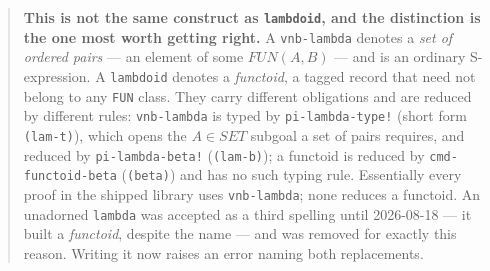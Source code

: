 \begin{itemize}
  \begin{quote}
  \textbf{This is not the same construct as \texttt{lambdoid}, and the
  distinction is the one most worth getting right.}  A \texttt{vnb-lambda}
  denotes a \emph{set of ordered pairs} --- an element of some
  $\mathit{FUN}(A,B)$ --- and is an ordinary S-expression.  A
  \texttt{lambdoid} denotes a \emph{functoid}, a tagged record that need not
  belong to any \texttt{FUN} class.  They carry different obligations and are
  reduced by different rules: \texttt{vnb-lambda} is typed by
  \texttt{pi-lambda-type!} (short form \texttt{(lam-t)}), which opens the
  $A \in \mathit{SET}$ subgoal a set of pairs requires, and reduced by
  \texttt{pi-lambda-beta!} (\texttt{(lam-b)}); a functoid is reduced by
  \texttt{cmd-functoid-beta} (\texttt{(beta)}) and has no such typing rule.
  Essentially every proof in the shipped library uses \texttt{vnb-lambda};
  none reduces a functoid.  An unadorned \texttt{lambda} was accepted as a
  third spelling until 2026-08-18 --- it built a \emph{functoid}, despite the
  name --- and was removed for exactly this reason.  Writing it now raises an
  error naming both replacements.
  \end{quote}


\end{itemize}
